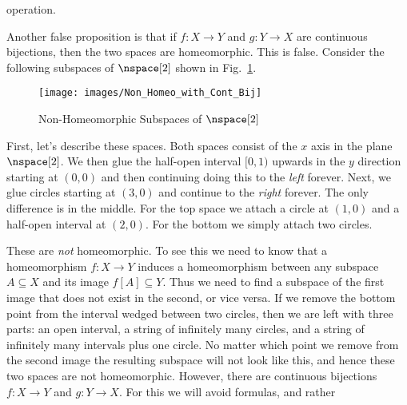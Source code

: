 \documentclass{book}                                                           %
\begin{document}
                operation.
                \par\hfill\par
                Another false proposition is that if $f:X\rightarrow{Y}$ and
                $g:Y\rightarrow{X}$ are continuous bijections, then the two
                spaces are homeomorphic. This is false. Consider the following
                subspaces of $\nspace[2]$ shown in
                Fig.~\ref{fig:Non_Homeomorphic_Subspace}.
                \begin{figure}[H]
                    \centering
                    \captionsetup{type=figure}
                    \texttt{[image: images/Non\_Homeo\_with\_Cont\_Bij]}
                    \caption{Non-Homeomorphic Subspaces of $\nspace[2]$}
                    \label{fig:Non_Homeomorphic_Subspace}
                \end{figure}
                First, let's describe these spaces. Both spaces consist of the
                $x$ axis in the plane $\nspace[2]$. We then glue the half-open
                interval $[0,1)$ upwards in the $y$ direction starting at
                $(0,0)$ and then continuing doing this to the \textit{left}
                forever. Next, we glue circles starting at $(3,0)$ and continue
                to the \textit{right} forever. The only difference is in the
                middle. For the top space we attach a circle at $(1,0)$ and a
                half-open interval at $(2,0)$. For the bottom we simply attach
                two circles.
                \par\hfill\par
                These are \textit{not} homeomorphic. To see this we need to know
                that a homeomorphism $f:X\rightarrow{Y}$ induces a
                homeomorphism between any subspace $A\subseteq{X}$ and its image
                $f[A]\subseteq{Y}$. Thus we need to find a subspace of the first
                image that does not exist in the second, or vice versa. If we
                remove the bottom point from the interval wedged between two
                circles, then we are left with three parts: an open interval,
                a string of infinitely many circles, and a string of infinitely
                many intervals plus one circle. No matter which point we remove
                from the second image the resulting subspace will not look like
                this, and hence these two spaces are not homeomorphic. However,
                there are continuous bijections $f:X\rightarrow{Y}$ and
                $g:Y\rightarrow{X}$. For this we will avoid formulas, and rather
\end{document}
